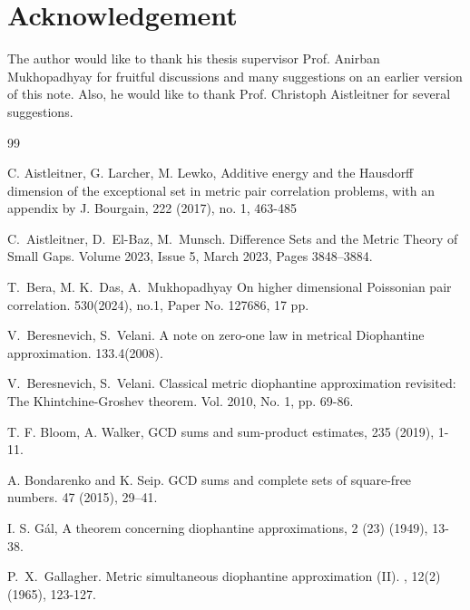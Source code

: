 \documentclass[12pt,article]{amsart}
\theoremstyle{remark}
\numberwithin{equation}{section}
\begin{document}
	\section{Acknowledgement}
	The author would like to thank his thesis supervisor Prof. Anirban Mukhopadhyay for fruitful discussions and many suggestions on an earlier version of this note.  Also, he would like to thank Prof. Christoph Aistleitner for several suggestions.
	
	
	\begin{thebibliography}{99}
		
		C. Aistleitner, G. Larcher, M. Lewko, 
		\newblock Additive energy and the Hausdorff dimension of the exceptional set in metric pair correlation problems, with an appendix by J. Bourgain,
		 222 (2017), no. 1, 463-485
		
		C.~Aistleitner, D.~El-Baz, M.~Munsch. 
		\newblock Difference Sets and the Metric Theory of Small Gaps.
		 Volume 2023, Issue 5, March 2023, Pages 3848–3884.
		
		T.~Bera, M. K.~Das, A.~Mukhopadhyay
		\newblock On higher dimensional Poissonian pair correlation.
		 530(2024), no.1, Paper No. 127686, 17 pp.
		
		V.~Beresnevich, S.~Velani.
		\newblock A note on zero-one law in metrical Diophantine approximation.
		 133.4(2008).
		
		V.~Beresnevich, S.~Velani.
		\newblock Classical metric diophantine approximation revisited: The Khintchine-Groshev theorem.
		 Vol. 2010, No. 1, pp. 69-86.
		
		T. F. Bloom, A. Walker,
		\newblock GCD sums and sum-product estimates,
		 235 (2019), 1-11.
		
		A. Bondarenko and K. Seip. 
		\newblock GCD sums and complete sets of square-free numbers.
		\newblock{\em }47 (2015), 29–41.
		
		I. S. G\'al, \newblock A theorem concerning diophantine approximations,
		 2 (23) (1949), 13-38.
		
		P.~X.~Gallagher.
		\newblock Metric simultaneous diophantine approximation (II). 
		, 12(2)(1965), 123-127. 
		

\end{thebibliography}
\end{document}
